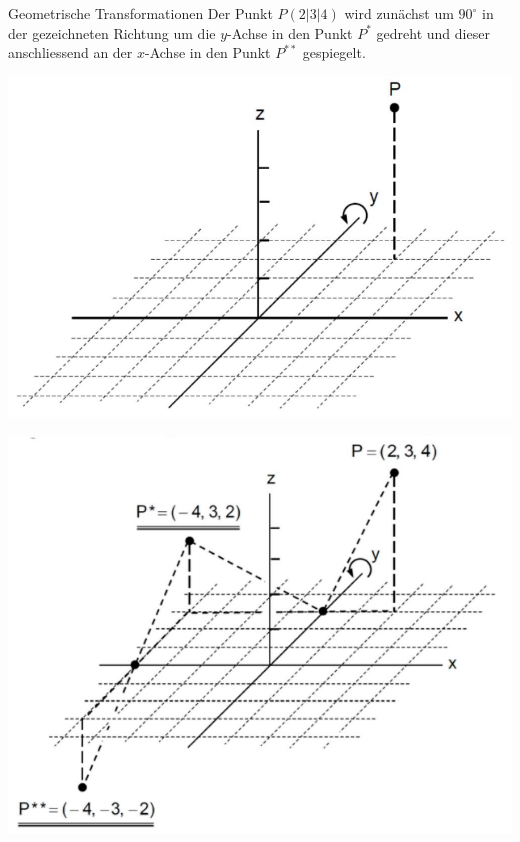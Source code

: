 \begin{example2}{Geometrische Transformationen}
    Der Punkt $P(2|3| 4)$ wird zunächst um $90^{\circ}$ in der gezeichneten Richtung um die $y$-Achse in den Punkt $P^{*}$ gedreht und dieser anschliessend an der $x$-Achse in den Punkt $P^{* *}$ gespiegelt.
    
    \begin{minipage}{0.5\linewidth}
        \includegraphics[width=1\linewidth]{images/geometrie_bsp1.png}
    \end{minipage}
    \begin{minipage}{0.5\linewidth}
        \includegraphics[width=1\linewidth]{images/geometrie_bsp2.png}
    \end{minipage}


\end{example2}
